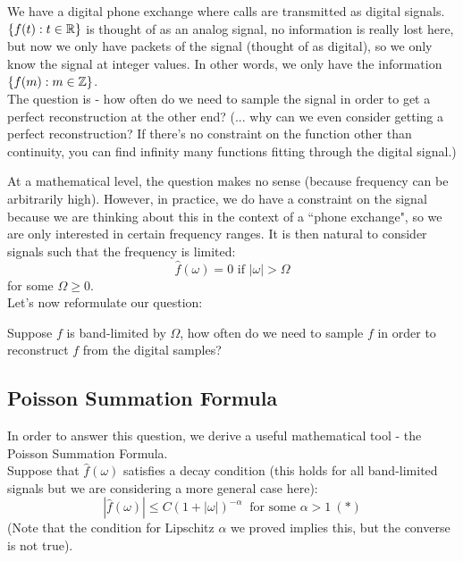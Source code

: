 \documentclass{article}
\begin{document}
\begin{question}
We have a digital phone exchange where calls are transmitted as digital signals. $\{f(t): t \in \mathbb{R}\}$ is thought of as an analog signal, no information is really lost here, but now we only have packets of the signal (thought of as digital), so we only know the signal at integer values. In other words, we only have the information $\{f(m): m \in \mathbb{Z}\}$.\\

The question is - how often do we need to sample the signal in order to get a perfect reconstruction at the other end? (... why can we even consider getting a perfect reconstruction? If there's no constraint on the function other than continuity, you can find infinity many functions fitting through the digital signal.) 
\end{question}

At a mathematical level, the question makes no sense (because frequency can be arbitrarily high). However, in practice, we do have a constraint on the signal because we are thinking about this in the context of a ``phone exchange", so we are only interested in certain frequency ranges. It is then natural to consider signals such that the frequency is limited:
\[\widehat{f}(\omega) = 0 \text{ if $|\omega| > \Omega$}\]
for some $\Omega \geq 0$.\\

Let's now reformulate our question:
\begin{question}
    Suppose $f$ is band-limited by $\Omega$, how often do we need to sample $f$ in order to reconstruct $f$ from the digital samples?
\end{question}

\subsection{Poisson Summation Formula}
In order to answer this question, we derive a useful mathematical tool - the Poisson Summation Formula.\\

Suppose that $\widehat{f}(\omega)$ satisfies a decay condition (this holds for all band-limited signals but we are considering a more general case here):
\[|\widehat{f}(\omega)| \leq C (1 + |\omega|)^{-\alpha}\ \text{ for some $\alpha > 1$}\ (*)\]
(Note that the condition for Lipschitz $\alpha$ we proved implies this, but the converse is not true).\\\\
\end{document}
